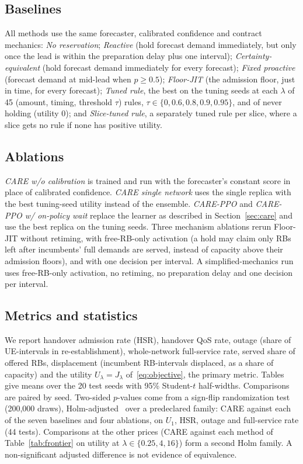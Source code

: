 \documentclass[conference]{IEEEtran}
\begin{document}
\subsection{Baselines}
All methods use the same forecaster, calibrated confidence and contract mechanics:
\emph{No reservation};
\emph{Reactive} (hold forecast demand immediately, but only once the lead is within the preparation delay plus one interval);
\emph{Certainty-equivalent} (hold forecast demand immediately for every forecast);
\emph{Fixed proactive} (forecast demand at mid-lead when $p\ge0.5$);
\emph{Floor-JIT} (the admission floor, just in time, for every forecast);
\emph{Tuned rule}, the best on the tuning seeds at each $\lambda$ of 45 (amount, timing, threshold $\tau$) rules, $\tau\in\{0,0.6,0.8,0.9,0.95\}$, and of never holding (utility $0$); and
\emph{Slice-tuned rule}, a separately tuned rule per slice, where a slice gets no rule if none has positive utility.

\subsection{Ablations}
\emph{CARE w/o calibration} is trained and run with the forecaster's constant score in place of calibrated confidence. \emph{CARE single network} uses the single replica with the best tuning-seed utility instead of the ensemble. \emph{CARE-PPO} and \emph{CARE-PPO w/ on-policy wait} replace the learner as described in Section~\ref{sec:care} and use the best replica on the tuning seeds. Three mechanism ablations rerun Floor-JIT without retiming, with free-RB-only activation (a hold may claim only RBs left after incumbents' full demands are served, instead of capacity above their admission floors), and with one decision per interval. A simplified-mechanics run uses free-RB-only activation, no retiming, no preparation delay and one decision per interval.

\subsection{Metrics and statistics}
We report handover admission rate (HSR), handover QoS rate, outage (share of UE-intervals in re-establishment), whole-network full-service rate, served share of offered RBs, displacement (incumbent RB-intervals displaced, as a share of capacity) and the utility $U_\lambda=J_\lambda$ of~\eqref{eq:objective}, the primary metric. Tables give means over the 20 test seeds with 95\% Student-$t$ half-widths. Comparisons are paired by seed. Two-sided $p$-values come from a sign-flip randomization test (200{,}000 draws), Holm-adjusted~\cite{holm1979simple} over a predeclared family: CARE against each of the seven baselines and four ablations, on $U_1$, HSR, outage and full-service rate (44 tests). Comparisons at the other prices (CARE against each method of Table~\ref{tab:frontier} on utility at $\lambda\in\{0.25,4,16\}$) form a second Holm family. A non-significant adjusted difference is not evidence of equivalence.
\end{document}
